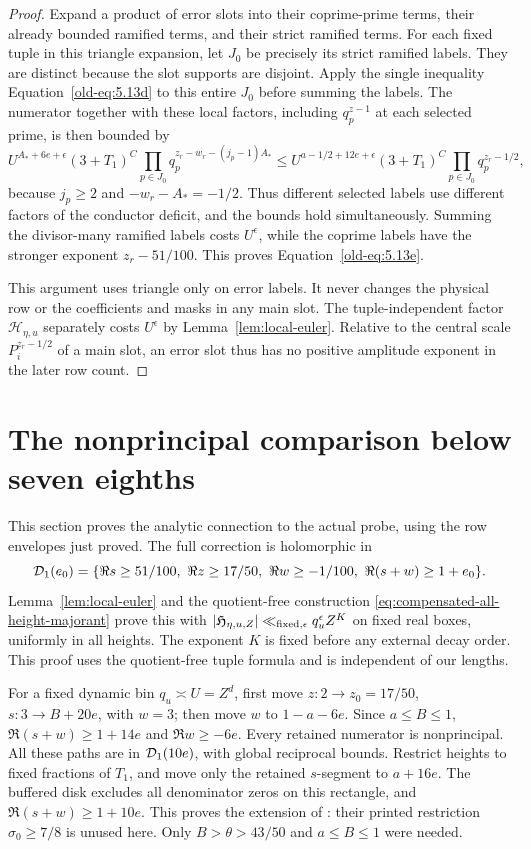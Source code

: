 \documentclass[12pt]{article}
\begin{document}
\begin{proof}
Expand a product of error slots into their coprime-prime terms,
their already bounded ramified terms, and their strict ramified
terms.  For each fixed tuple in this triangle expansion, let $J_0$
be precisely its strict ramified labels.  They are distinct because
the slot supports are disjoint.  Apply the single inequality
Equation~\eqref{old-eq:5.13d} to this entire $J_0$ before summing
the labels.  The numerator together with these local factors,
including $q_p^{z-1}$ at each selected prime, is then bounded by
\[
 U^{A_*+6e+\epsilon}(3+T_1)^C
 \prod_{p\in J_0}q_p^{z_r-w_r-(j_p-1)A_*}
 \le U^{a-1/2+12e+\epsilon}(3+T_1)^C
       \prod_{p\in J_0}q_p^{z_r-1/2},
\]
because $j_p\ge2$ and $-w_r-A_*=-1/2$.  Thus different selected
labels use different factors of the conductor deficit, and the
bounds hold simultaneously.  Summing the divisor-many ramified labels costs
$U^\epsilon$, while the coprime labels have the stronger exponent
$z_r-51/100$.  This proves Equation~\eqref{old-eq:5.13e}.

This argument uses triangle only on error labels.  It never changes
the physical row or the coefficients and masks in any main slot.
The tuple-independent factor $\mathcal H_{\eta,u}$ separately costs
$U^\epsilon$ by Lemma~\ref{lem:local-euler}.  Relative to the
central scale $P_i^{z_r-1/2}$ of a main slot, an error slot thus
has no positive amplitude exponent in the later row count.
\end{proof}

\section{The nonprincipal comparison below seven eighths}\label{sec:nonprincipal}
This section proves the analytic connection to the actual probe,
using the row envelopes just proved.
The full correction is holomorphic in
\[
 {\cal D}_1(e_0)=
 \{\Re s\ge51/100,\ \Re z\ge17/50,\ \Re w\ge-1/100,\
                       \Re(s+w)\ge1+e_0\}.
\]
Lemma~\ref{lem:local-euler} and the quotient-free construction
\eqref{eq:compensated-all-height-majorant} prove this with
\(|\mathfrak H_{\eta,u,Z}|\ll_{\rm fixed,\epsilon}q_u^\epsilon Z^K\)
on fixed real boxes, uniformly in all heights.  The exponent \(K\)
is fixed before any external decay order.  This proof uses the
quotient-free tuple formula and is independent of our lengths.

For a fixed dynamic bin \(q_u\asymp U=Z^d\), first move
\(z:2\to z_0=17/50\), \(s:3\to B+20e\), with \(w=3\);
then move \(w\) to \(1-a-6e\).  Since \(a\le B\le1\),
\(\Re(s+w)\ge1+14e\) and \(\Re w\ge-6e\).
Every retained numerator is nonprincipal.  All these paths are
in \({\cal D}_1(10e)\), with global reciprocal bounds.
Restrict heights to fixed fractions of \(T_1\), and move only
the retained \(s\)-segment to \(a+16e\).
The buffered disk excludes all denominator zeros on this rectangle,
and \(\Re(s+w)\ge1+10e\).
This proves the extension of \cite[Lemmas 10.3--10.4]{QRH}:
their printed restriction \(\sigma_0\ge7/8\) is unused here.
Only \(B>\theta>43/50\) and \(a\le B\le1\) were needed.
\end{document}
